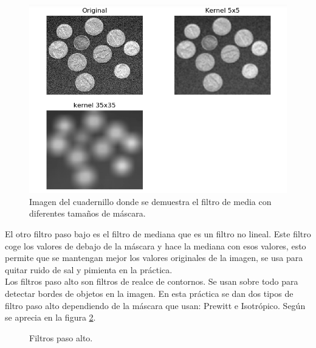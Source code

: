\begin{figure}[h]
\centering
\includegraphics[width=1\textwidth]{imagenes/filtromedia}
\caption{Imagen del cuadernillo donde se demuestra el filtro de media con diferentes tamaños de máscara.}
\label{filtromedia}
\end{figure}

El otro filtro paso bajo es el filtro de mediana que es un filtro no lineal. Este filtro coge los valores de debajo de la máscara y  hace la mediana con esos valores, esto permite que se mantengan mejor los valores originales de la imagen, se usa para quitar ruido de sal y pimienta en la práctica.\\

Los filtros paso alto son filtros de realce de contornos. Se usan sobre todo para detectar bordes de objetos en la imagen. En esta práctica se dan dos tipos de filtro paso alto dependiendo de la máscara que usan: Prewitt e Isotrópico. Según se aprecia en la figura \ref{fpa}.

\begin{figure}[!tbp]
  \centering
  \hfill
  \caption{Filtros paso alto.}
  \label{fpa}
\end{figure}

